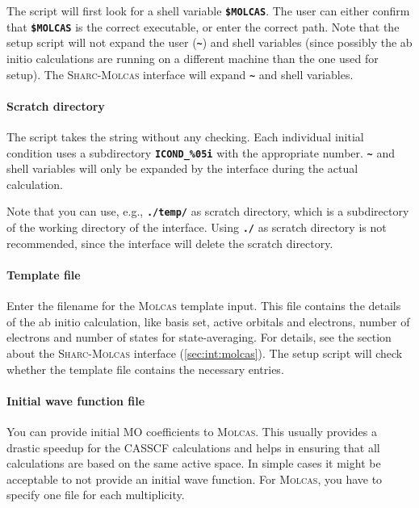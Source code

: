 \documentclass[a4paper,10pt,DIV=15,openany,twoside=false]{scrbook}
\newcommand{\sharc}{\textsc{Sharc}}
\newcommand{\ttt}[1]{\textbf{\texttt{#1}}}
\begin{document}
The script will first look for a shell variable \ttt{\$MOLCAS}. The user can either confirm that \ttt{\$MOLCAS} is the correct executable, or enter the correct path. Note that the setup script will not expand the user (\ttt{\textasciitilde}) and shell variables (since possibly the ab initio calculations are running on a different machine than the one used for setup). The \sharc-\textsc{Molcas} interface will expand \ttt{\textasciitilde} and shell variables.

\paragraph{Scratch directory}

The script takes the string without any checking. Each individual initial condition uses a subdirectory \ttt{ICOND\_\%05i} with the appropriate number. \ttt{\textasciitilde} and shell variables will only be expanded by the interface during the actual calculation.

Note that you can use, e.g., \ttt{./temp/} as scratch directory, which is a subdirectory of the working directory of the interface. Using \ttt{./} as scratch directory is not recommended, since the interface will delete the scratch directory.

\paragraph{Template file}

Enter the filename for the \textsc{Molcas} template input. This file contains the details of the ab initio calculation, like basis set, active orbitals and electrons, number of electrons and number of states for state-averaging. For details, see the section about the \sharc-\textsc{Molcas} interface (\ref{sec:int:molcas}). The setup script will check whether the template file contains the necessary entries. 

\paragraph{Initial wave function file}

You can provide initial MO coefficients to \textsc{Molcas}. This usually provides a drastic speedup for the CASSCF calculations and helps in ensuring that all calculations are based on the same active space. In simple cases it might be acceptable to not provide an initial wave function. For \textsc{Molcas}, you have to specify one file for each multiplicity.
\end{document}

